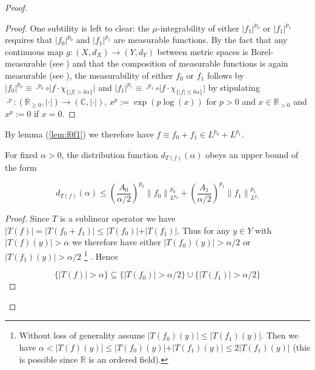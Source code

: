 \begin{proof}
\begin{proof}
	One subtility is left to clear: the $\mu$-integrability of either $\vert f_1\vert^{p_0}$ or $\vert f_1 \vert^{p_1}$ requires that $\vert f_0 \vert^{p_0}$ and $\vert f_1 \vert^{p_1}$ are measurable functions. By the fact that any continuous map $g: (X,d_X) \rightarrow (Y,d_Y)$ between metric spaces is Borel-measurable (see \cite[86]{elstrodt:mass:2011}) and that the composition of measurable functions is again measurable (see \cite[87]{elstrodt:mass:2011}), the measurability of either $f_0$ or $f_1$ follows by $\vert f_0 \vert^{p_0} \equiv \cdot^{p_0} \circ \vert f \cdot \chi_{\{\vert f\vert > \delta\alpha\}}\vert$ and $\vert f_1 \vert^{p_1} \equiv \cdot^{p_1} \circ \vert f \cdot \chi_{\{\vert f \vert \leq \delta \alpha\}}\vert$ by stipulating $\cdot^{p}: (\mathbb{R}_{\geq 0},\vert \cdot \vert) \rightarrow (\mathbb{C},\vert \cdot \vert)$, $x^{p} := \exp(p \log(x))$ for $p > 0$ and $x \in \mathbb{R}_{> 0}$ and $x^p := 0$ if $x = 0$.
\end{proof}

By lemma (\ref{lem:f0f1}) we therefore have $f \equiv f_0 + f_1 \in L^{p_0} + L^{p_1}$. 

\begin{lemma}
	For fixed $\alpha > 0$, the distribution function $d_{T(f)}(\alpha)$ obeys an upper bound of the form

	\begin{equation*}
		d_{T(f)}(\alpha) \leq  \left(\frac{A_0}{\alpha/2}\right)^{p_0} \left\|f_0\right\|^{p_0}_{L^{p_0}} + \left(\frac{A_1}{\alpha/2}\right)^{p_1} \left\|f_1\right\|^{p_1}_{L^{p_1}}
	\end{equation*}
\end{lemma}

\begin{proof}
Since $T$ is a sublinear operator we have $\vert T(f) \vert = \vert T(f_0 + f_1) \vert \leq \vert T(f_0) \vert + \vert T(f_1)\vert$. Thus for any $y \in Y$ with $\vert T(f)(y) \vert > \alpha$ we therefore have either $\vert T(f_0)(y) \vert > \alpha/2$ or $\vert T(f_1)(y) \vert > \alpha/2$ 
		\footnote{Without loss of generality assume $\vert T(f_0)(y) \vert \leq \vert T(f_1)(y) \vert $. Then we have $\alpha < \vert T(f)(y)\vert \leq \vert T(f_0)(y) \vert + \vert T(f_1)(y)\vert \leq 2\vert T(f_1)(y)\vert$ (this is possible since $\mathbb{R}$ is an ordered field).}
		. Hence

\begin{equation*}
	\{\vert T(f)\vert > \alpha \} \subseteq \{\vert T(f_0) \vert > \alpha/2 \} \cup \{\vert T(f_1) \vert > \alpha/2 \}
\end{equation*}


\end{proof}
\end{proof}
